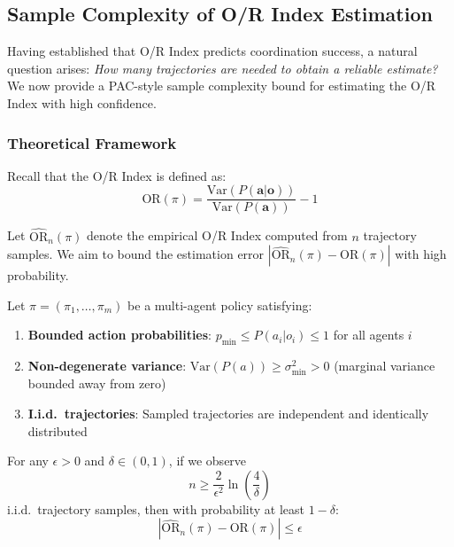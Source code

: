 
\subsection{Sample Complexity of O/R Index Estimation}
\label{subsec:sample_complexity_full}

Having established that O/R Index predicts coordination success, a natural question arises: \textit{How many trajectories are needed to obtain a reliable estimate?} We now provide a PAC-style sample complexity bound for estimating the O/R Index with high confidence.

\subsubsection{Theoretical Framework}

Recall that the O/R Index is defined as:
\begin{equation}
\text{OR}(\pi) = \frac{\text{Var}(P(\mathbf{a}|\mathbf{o}))}{\text{Var}(P(\mathbf{a}))} - 1
\end{equation}

Let $\widehat{\text{OR}}_n(\pi)$ denote the empirical O/R Index computed from $n$ trajectory samples. We aim to bound the estimation error $|\widehat{\text{OR}}_n(\pi) - \text{OR}(\pi)|$ with high probability.

\begin{theorem}
\label{thm:sample_complexity_full}
Let $\pi = (\pi_1, \dots, \pi_m)$ be a multi-agent policy satisfying:
\begin{enumerate}[label=(\roman*)]
    \item \textbf{Bounded action probabilities}: $p_{\min} \leq P(a_i|o_i) \leq 1$ for all agents $i$
    \item \textbf{Non-degenerate variance}: $\text{Var}(P(a)) \geq \sigma^2_{\min} > 0$ (marginal variance bounded away from zero)
    \item \textbf{I.i.d.\ trajectories}: Sampled trajectories are independent and identically distributed
\end{enumerate}
For any $\epsilon > 0$ and $\delta \in (0,1)$, if we observe
\begin{equation}
n \geq \frac{2}{\epsilon^2} \ln\left(\frac{4}{\delta}\right)
\end{equation}
i.i.d.\ trajectory samples, then with probability at least $1 - \delta$:
\begin{equation}
|\widehat{\text{OR}}_n(\pi) - \text{OR}(\pi)| \leq \epsilon
\end{equation}
\end{theorem}

